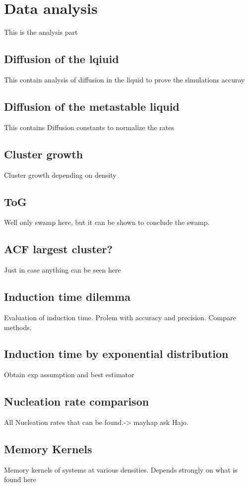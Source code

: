
\section{Data analysis}
\label{sec:data_analysis}
This is the analysis part

\subsection{Diffusion of the lqiuid}
This contain analysis of diffusion in the liquid to prove the simulations accuray

\subsection{Diffusion of the metastable liquid}
This contains Diffusion constants to normalize the rates

\subsection{Cluster growth}
Cluster growth depending on density

\subsection{ToG}
Well only swamp here, but it can be shown to conclude the swamp.

\subsection{ACF largest cluster?}
Just in case anything can be seen here

\subsection{Induction time dilemma}
Evaluation of induction time. Prolem with accuracy and precision. Compare methods.

\subsection{Induction time by exponential distribution}
Obtain exp assumption and best estimator

\subsection{Nucleation rate comparison}
All Nucleation rates that can be found.-> mayhap ask Hajo.

\subsection{Memory Kernels}
Memory kernels of systems at various densities. Depends strongly on what is found here





